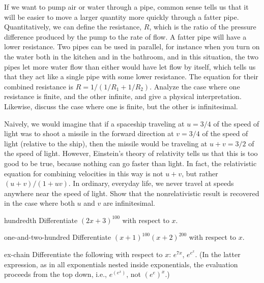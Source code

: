 \begin{hwsection}
\begin{hw}
If we want to pump air or water through a pipe, common sense tells us that it will be easier
to move a larger quantity more quickly through a fatter pipe. Quantitatively, we can define
the resistance, $R$, which is the ratio of the pressure difference produced by the pump to the
rate of flow. A fatter pipe will have a lower resistance. Two pipes can be used in parallel,
for instance when you turn on the water both in the kitchen and in the bathroom, and in this
situation, the two pipes let more water flow than either would have let flow by itself, which
tells us that they act like a single pipe with some lower resistance. The equation for their
combined resistance is $R=1/(1/R_1+1/R_2)$. Analyze the case where one resistance is finite,
and the other infinite, and give a physical interpretation. Likewise, discuss the case where
one is finite, but the other is infinitesimal.
\end{hw}

\begin{hw}
Naively, we would imagine that if a spaceship traveling at $u=3/4$ of the speed of light was to shoot a missile
in the forward direction at $v=3/4$ of the speed of light (relative to the ship), then the missile would be traveling at $u+v=3/2$ of the
speed of light. However, Einstein's theory of relativity tells us that this is too good to be true, because
nothing can go faster than light. In fact, the relativistic equation for combining velocities in this way
is not $u+v$, but rather $(u+v)/(1+uv)$. In ordinary, everyday life, we never travel at speeds anywhere near
the speed of light. Show that the nonrelativistic result is recovered in the case where both $u$ and $v$ are
infinitesimal.
\end{hw}

\begin{hwwithsoln}{hundredth}
Differentiate  $(2x+3)^{100}$ with respect to $x$.
\end{hwwithsoln}

\begin{hwwithsoln}{one-and-two-hundred}
Differentiate  $(x+1)^{100}(x+2)^{200}$ with respect to $x$.
\end{hwwithsoln}

\begin{hwwithsoln}{ex-chain}
Differentiate  the following with respect to $x$: $e^{7x}$, $e^{e^x}$. (In the latter expression,
as in all exponentials nested inside exponentials, the evaluation proceeds from the top down, i.e.,
$e^{(e^x)}$, not $(e^e)^x$.)
\end{hwwithsoln}


\end{hwsection}
